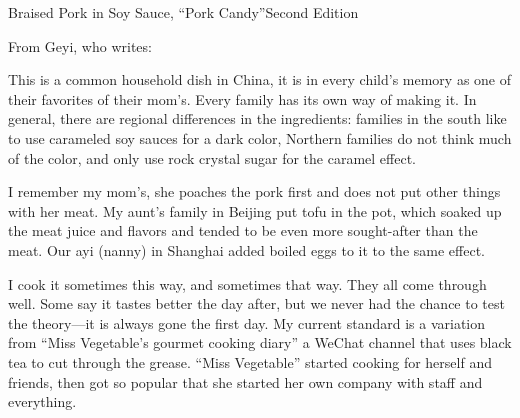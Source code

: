 \begin{entry}{Braised Pork in Soy Sauce, ``Pork Candy''}{Second Edition}

\begin{open}
  From Geyi, who writes:

  This is a common household dish in China, it is in every child's memory as one of their favorites of their mom's. Every family has its own way of making it. In general, there are regional differences in the ingredients: families in the south like to use carameled soy sauces for a dark color, Northern families do
  not think much of the color, and only use rock crystal sugar for the caramel effect.

  I remember my mom’s, she poaches the pork first and does not put other things
  with her meat. My aunt’s family in Beijing put tofu in the pot, which soaked
  up the meat juice and flavors and tended to be even more sought-after than the
  meat. Our ayi (nanny) in Shanghai added boiled eggs to it to the same effect.

  I cook it sometimes this way, and sometimes that way. They all come through well. Some say it tastes better the day after, but we never had the chance to test the theory---it is always gone the first day. My current standard is a variation from ``Miss Vegetable's gourmet cooking diary'' a WeChat channel that uses black tea to cut through the grease. ``Miss Vegetable'' started cooking for herself and friends, then got so popular that she started her own company with staff and everything.


\end{open}
\end{entry}
